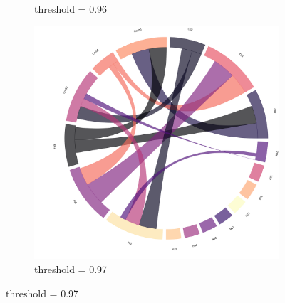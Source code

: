 \begin{figure}[!ht]
\begin{subfigure}[b]{0.3\linewidth}
		\caption{threshold = 0.96}
	\end{subfigure}
	\hfill
	\begin{subfigure}[b]{0.3\linewidth}
		\includegraphics[width=\linewidth]{figures/chords/chord_swap_Ensemble1000_RCN5333300_097.png}
		\caption{threshold = 0.97}
	\end{subfigure}
	

\end{figure}
